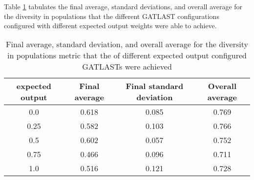 Table \ref{tab:HP:GA:ExpectedOutput:diversity in populations} tabulates the final average, standard deviations, and overall average for the diversity in populations that the different GATLAST configurations configured with different expected output weights were able to achieve.
\begin{table}[tbh!]
\centering
\begin{adjustbox}{trim=0cm 0cm 0cm 0cm, clip=true}
\begin{tabular}{|c|c|c|c|}
\hline
expected output & Final average & Final standard deviation & Overall average\\
\hline
0.0 & 0.618 & 0.085 & 0.769\\\hline
0.25 & 0.582 & 0.103 & 0.766\\\hline
0.5 & 0.602 & 0.057 & 0.752\\\hline
0.75 & 0.466 & 0.096 & 0.711\\\hline
1.0 & 0.516 & 0.121 & 0.728\\\hline
\end{tabular}
\end{adjustbox}
\caption{Final average, standard deviation, and overall average for the diversity in populations metric that the of different expected output configured GATLASTs were achieved}
\label{tab:HP:GA:ExpectedOutput:diversity in populations}
\end{table}